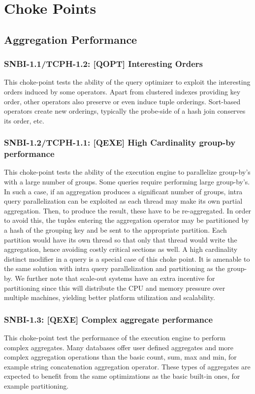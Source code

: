 \section{Choke Points}

\subsection{Aggregation Performance}

\subsubsection{SNBI-1.1/TCPH-1.2: [QOPT]  Interesting Orders}
\label{choke_point_1.1}
This choke-point tests the ability of the query optimizer to exploit the interesting orders induced by some operators. Apart from clustered indexes providing key order, other operators also preserve or even induce tuple orderings.
Sort-based operators create new orderings, typically the probe-side of a hash join conserves its order, etc.

\subsubsection{SNBI-1.2/TCPH-1.1: [QEXE] High Cardinality group-by performance}
\label{choke_point_1.2}
This choke-point tests the ability of the execution engine to parallelize group-by's with a large number of groups. Some queries require performing large group-by's.
In such a case, if an aggregation produces a significant number of groups, intra query parallelization can be exploited as each thread may make its own partial aggregation.
Then, to produce the result, these have to be re-aggregated. In order to avoid this, the tuples entering the aggregation operator may be partitioned by a hash of the grouping key and be sent to the appropriate partition.
Each partition would have its own thread so that only that thread would write the aggregation, hence avoiding costly critical sections as well. A high cardinality distinct modifier in a query is a special case of this choke point.
It is amenable to the same solution with intra query parallelization and partitioning as the group-by.
We further note that scale-out systems have an extra incentive for partitioning since this will distribute the CPU and memory pressure over multiple machines, yielding better platform utilization and scalability.

\subsubsection{SNBI-1.3: [QEXE] Complex aggregate performance}
\label{choke_point_1.3}
This choke-point test the performance of the execution engine to perform complex aggregates. Many databases offer user defined aggregates and more complex aggregation operations than the basic count, sum, max and min, for example string concatenation aggregation operator. These types of aggregates are expected to benefit from the same optimizations as the basic built-in ones, for example partitioning.

